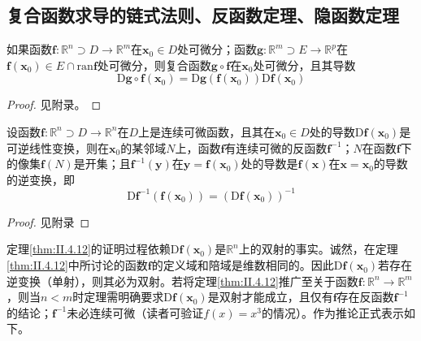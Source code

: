 \documentclass[../main.tex]{subfiles}
\begin{document}
\subsection{复合函数求导的链式法则、反函数定理、隐函数定理}
\begin{theorem}[复合函数求导的链式法则]\label{thm:II.4.11}
    如果函数$\mathbf{f}:\mathbb{R}^n\supset D\rightarrow\mathbb{R}^m$在$\mathbf{x}_0\in D$处可微分；函数$\mathbf{g}:\mathbb{R}^m\supset E\rightarrow\mathbb{R}^p$在$\mathbf{f}\left(\mathbf{x}_0\right)\in E\cap \mathrm{ran}\mathbf{f}$处可微分，则复合函数$\mathbf{g}\circ\mathbf{f}$在$\mathbf{x}_0$处可微分，且其导数
    \[\mathrm{D}\mathbf{g}\circ\mathbf{f}\left(\mathbf{x}_0\right)=\mathrm{D}\mathbf{g}\left(\mathbf{f}\left(\mathbf{x}_0\right)\right)\mathrm{D}\mathbf{f}\left(\mathbf{x}_0 \right)\]
\end{theorem}
\begin{proof}
    见附录。
\end{proof}

\begin{theorem}[反函数定理]\label{thm:II.4.12}
    设函数$\mathbf{f}:\mathbb{R}^n\supset D\rightarrow\mathbb{R}^n$在$D$上是连续可微函数，且其在$\mathbf{x}_0\in D$处的导数$\mathrm{D}\mathbf{f}\left(\mathbf{x}_0\right)$是可逆线性变换，则在$\mathbf{x}_0$的某邻域$N$上，函数$\mathbf{f}$有连续可微的反函数$\mathbf{f}^{-1}$；$N$在函数$\mathbf{f}$下的像集$\mathbf{f}\left(N\right)$是开集；且$\mathbf{f}^{-1}\left(\mathbf{y}\right)$在$\mathbf{y}=\mathbf{f}\left(\mathbf{x}_0\right)$处的导数是$\mathbf{f}\left(\mathbf{x}\right)$在$\mathbf{x}=\mathbf{x}_0$的导数的逆变换，即
    \[\mathrm{D}\mathbf{f}^{-1}\left(\mathbf{f}\left(\mathbf{x}_0\right)\right)=\left(\mathrm{D}\mathbf{f}\left(\mathbf{x}_0\right)\right)^{-1}\]
\end{theorem}
\begin{proof}
    见附录
\end{proof}

定理\ref{thm:II.4.12}的证明过程依赖$\mathrm{D}\mathbf{f}\left(\mathbf{x}_0\right)$是$\mathbb{R}^n$上的双射的事实。诚然，在定理\ref{thm:II.4.12}中所讨论的函数$\mathbf{f}$的定义域和陪域是维数相同的。因此$\mathrm{D}\mathbf{f}\left(\mathbf{x}_0\right)$若存在逆变换（单射），则其必为双射。若将定理\ref{thm:II.4.12}推广至关于函数$\mathbf{f}:\mathbb{R}^n\rightarrow\mathbb{R}^m$，则当$n<m$时定理需明确要求$\mathrm{D}\mathbf{f}\left(\mathbf{x}_0\right)$是双射才能成立，且仅有$\mathbf{f}$存在反函数$\mathbf{f}^{-1}$的结论；$\mathbf{f}^{-1}$未必连续可微（读者可验证$f\left(x\right)=x^3$的情况）。作为推论正式表示如下。
\end{document}
